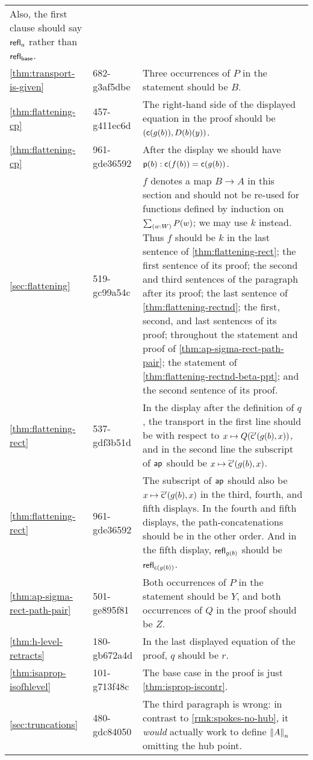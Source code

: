 \documentclass[
%
%
11pt %
]{article}
\begin{document}
\begin{longtable}{llp{10.5cm}}
  Also, the first clause should say $\refl{a}$ rather than $\refl{\base}$.\\
  \cref{thm:transport-is-given}
  & 682-g3af5dbe
  & Three occurrences of $P$ in the statement should be $B$.\\
  \cref{thm:flattening-cp}
  & 457-g411ec6d
  & The right-hand side of the displayed equation in the proof should be $(\cc(g(b)),D(b)(y))$.\\
  \cref{thm:flattening-cp}
  & 961-gde36592
  & After the display we should have $\pp(b):\cc(f(b))=\cc(g(b))$.\\
  \cref{sec:flattening}
  & 519-gc99a54c
  & $f$ denotes a map $B\to A$ in this section and should not be re-used for functions defined by induction on $\sm{w:W} P(w)$; we may use $k$ instead.
  Thus $f$ should be $k$ in the last sentence of \cref{thm:flattening-rect}; the first sentence of its proof; the second and third sentences of the paragraph after its proof; the last sentence of \cref{thm:flattening-rectnd}; the first, second, and last sentences of its proof; throughout the statement and proof of \cref{thm:ap-sigma-rect-path-pair}; the statement of \cref{thm:flattening-rectnd-beta-ppt}; and the second sentence of its proof.\\
  \cref{thm:flattening-rect}
  & 537-gdf3b51d
  & In the display after the definition of $q$, the transport in the first line should be with respect to $x\mapsto Q(\cct'(g(b),x))$, and in the second line the subscript of $\apfunc{}$ should be $x\mapsto \cct'(g(b),x)$.\\
  \cref{thm:flattening-rect}
  & 961-gde36592
  & The subscript of $\apfunc{}$ should also be $x\mapsto \cct'(g(b),x)$ in the third, fourth, and fifth displays.
  In the fourth and fifth displays, the path-concatenations should be in the other order.
  And in the fifth display, $\refl{g(b)}$ should be $\refl{\cc(g(b))}$.\\
  \cref{thm:ap-sigma-rect-path-pair}
  & 501-ge895f81
  & Both occurrences of $P$ in the statement should be $Y$, and both occurrences of $Q$ in the proof should be $Z$.\\
  \cref{thm:h-level-retracts}
  & 180-gb672a4d
  & In the last displayed equation of the proof, $q$ should be $r$.\\
  \cref{thm:isaprop-isofhlevel}
  & 101-g713f48c
  & The base case in the proof is just \cref{thm:isprop-iscontr}.\\
  \cref{sec:truncations}
  & 480-gdc84050
  & The third paragraph is wrong: in contrast to \cref{rmk:spokes-no-hub}, it \emph{would} actually work to define $\trunc nA$ omitting the hub point.\\

\end{longtable}
\end{document}
